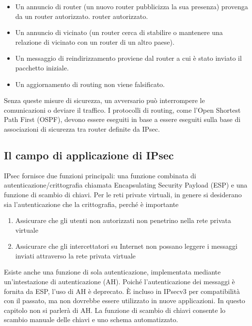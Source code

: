 \begin{itemize}
    \item Un annuncio di router (un nuovo router pubblicizza la sua presenza) provenga da un router autorizzato.
router autorizzato.

    \item Un annuncio di vicinato (un router cerca di stabilire o mantenere una relazione di vicinato con un router di un altro paese).
    
    \item Un messaggio di reindirizzamento proviene dal router a cui è stato inviato il pacchetto iniziale.
    
    \item Un aggiornamento di routing non viene falsificato.
\end{itemize}
Senza queste misure di sicurezza, un avversario può interrompere le comunicazioni o deviare il traffico. I protocolli di routing, come l'Open Shortest Path First (OSPF), devono essere eseguiti in base a essere eseguiti sulla base di associazioni di sicurezza tra router definite da IPsec.

\subsection{Il campo di applicazione di IPsec}
IPsec fornisce due funzioni principali: una funzione combinata di autenticazione/crittografia chiamata Encapsulating Security Payload (ESP) e una funzione di scambio di chiavi. Per le reti private virtuali, in genere si desiderano sia l'autenticazione che la crittografia, perché è importante 

\begin{enumerate}
    \item Assicurare che gli utenti non autorizzati non penetrino nella rete privata virtuale
    
    \item Assicurare che gli intercettatori su Internet non possano leggere i messaggi inviati attraverso la rete privata virtuale
\end{enumerate}
Esiste anche una funzione di sola autenticazione, implementata mediante un'intestazione di autenticazione (AH). Poiché l'autenticazione dei messaggi è fornita da ESP, l'uso di AH è deprecato. È incluso in IPsecv3 per compatibilità con il passato, ma non dovrebbe essere utilizzato in nuove applicazioni. In questo capitolo non si parlerà di AH. La funzione di scambio di chiavi consente lo scambio manuale delle chiavi e uno schema automatizzato. 

